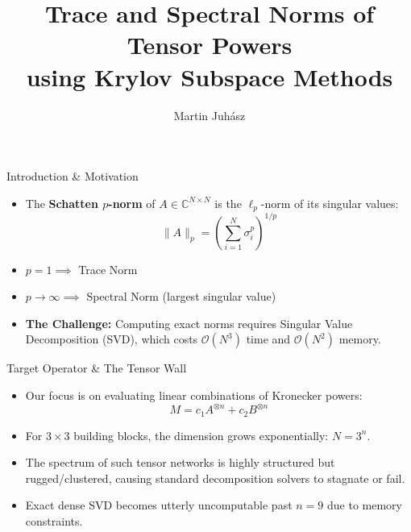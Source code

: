 \documentclass[aspectratio=169]{beamer}
\title{Trace and Spectral Norms of Tensor Powers \\ using Krylov Subspace Methods}
\author{Martin Juhász}
\date{}
\begin{document}
\begin{frame}
  \titlepage
\end{frame}

\begin{frame}{Introduction \& Motivation}
  \begin{itemize}
    \item The \textbf{Schatten $p$-norm} of $A \in \mathbb{C}^{N \times N}$ is the $\ell_p$-norm of its singular values:
      \begin{equation*}
        \|A\|_p = \left( \sum_{i=1}^N \sigma_i^p \right)^{1/p}
      \end{equation*}
    \item $p=1 \implies$ Trace Norm
    \item $p \to \infty \implies$ Spectral Norm (largest singular value)
    \item \textbf{The Challenge:} Computing exact norms requires Singular Value Decomposition (SVD), which costs $\mathcal{O}(N^3)$ time and $\mathcal{O}(N^2)$ memory.
  \end{itemize}
\end{frame}

\begin{frame}{Target Operator \& The Tensor Wall}
  \begin{itemize}
    \item Our focus is on evaluating linear combinations of Kronecker powers:
      \begin{equation*}
        M = c_1 A^{\otimes n} + c_2 B^{\otimes n}
      \end{equation*}
    \item For $3 \times 3$ building blocks, the dimension grows exponentially: \textbf{$N = 3^n$}.
    \item The spectrum of such tensor networks is highly structured but rugged/clustered, causing standard decomposition solvers to stagnate or fail.
    \item Exact dense SVD becomes utterly uncomputable past $n=9$ due to memory constraints.
  \end{itemize}
\end{frame}
\end{document}
